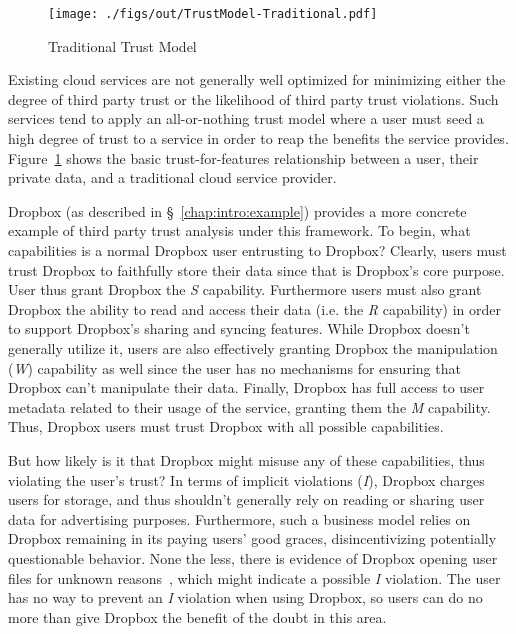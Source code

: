 \begin{figure}[t]
  \centering
  \texttt{[image: ./figs/out/TrustModel-Traditional.pdf]}
  \caption{Traditional Trust Model}
  \label{fig:trust-traditional}
\end{figure}

Existing cloud services are not generally well optimized for
minimizing either the degree of third party trust or the likelihood of
third party trust violations. Such services tend to apply an
all-or-nothing trust model where a user must seed a high degree of
trust to a service in order to reap the benefits the service
provides. Figure~\ref{fig:trust-traditional} shows the basic
trust-for-features relationship between a user, their private data,
and a traditional cloud service provider.

Dropbox (as described in \S~\ref{chap:intro:example}) provides a more
concrete example of third party trust analysis under this
framework. To begin, what capabilities is a normal Dropbox user
entrusting to Dropbox? Clearly, users must trust Dropbox to faithfully
store their data since that is Dropbox's core purpose. User thus grant
Dropbox the \emph{S} capability. Furthermore users must also grant
Dropbox the ability to read and access their data (i.e. the \emph{R}
capability) in order to support Dropbox's sharing and syncing
features. While Dropbox doesn't generally utilize it, users are also
effectively granting Dropbox the manipulation (\emph{W}) capability as
well since the user has no mechanisms for ensuring that Dropbox can't
manipulate their data. Finally, Dropbox has full access to user
metadata related to their usage of the service, granting them the
\emph{M} capability. Thus, Dropbox users must trust Dropbox with all
possible capabilities.

But how likely is it that Dropbox might misuse any of these
capabilities, thus violating the user's trust? In terms of implicit
violations (\emph{I}), Dropbox charges users for storage, and thus
shouldn't generally rely on reading or sharing user data for
advertising purposes. Furthermore, such a business model relies on
Dropbox remaining in its paying users' good graces, disincentivizing
potentially questionable behavior. None the less, there is evidence of
Dropbox opening user files for unknown
reasons~\cite{vintsurf-dropbox}, which might indicate a possible
\emph{I} violation. The user has no way to prevent an \emph{I}
violation when using Dropbox, so users can do no more than give
Dropbox the benefit of the doubt in this area.

